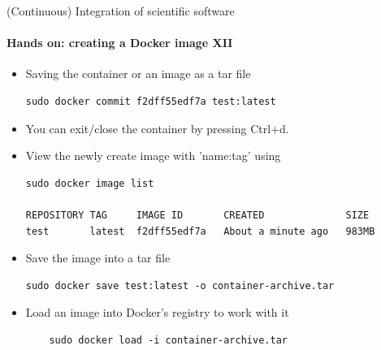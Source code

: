 \begin{frame}[fragile]{(Continuous) Integration of scientific software} 
    \framesubtitle{Hands on: creating a Docker image XII} 
    \vfill

    \begin{itemize}
        \item Saving the container or an image as a tar file 

    \begin{verbatim}
sudo docker commit f2dff55edf7a test:latest
    \end{verbatim}

        \item You can exit/close the container by pressing Ctrl+d.

        \item View the newly create image with 'name:tag' using 

    \begin{verbatim}
sudo docker image list 

REPOSITORY TAG     IMAGE ID       CREATED              SIZE
test       latest  f2dff55edf7a   About a minute ago   983MB
    \end{verbatim}

    \item Save the image into a tar file 

    \begin{verbatim}
sudo docker save test:latest -o container-archive.tar
    \end{verbatim}

    \item Load an image into Docker's registry to work with it 

    \begin{verbatim}
    sudo docker load -i container-archive.tar
    \end{verbatim}

\end{itemize}

\end{frame}


